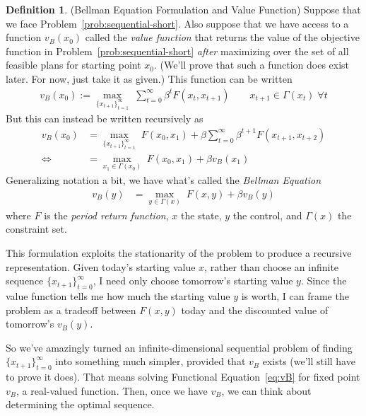 \documentclass[12pt]{article}
\numberwithin{equation}{section} %
\theoremstyle{plain}
\theoremstyle{definition}
\newtheorem{defn}[thm]{Definition}
\theoremstyle{remark}
\newcommand{\sumtinfz}{\sum^\infty_{t=0}}
\begin{document}
\begin{defn}{(Bellman Equation Formulation and Value Function)}
\label{defn:bellman}
Suppose that we face Problem~\ref{prob:sequential-short}.  Also suppose
that we have access to a function $v_B(x_0)$ called the \emph{value
function} that returns the value of the objective function in
Problem~\ref{prob:sequential-short} \emph{after} maximizing over the set
of all feasible plans for starting point $x_0$. (We'll prove that such a
function does exist later. For now, just take it as given.) This
function can be written
\begin{align*}
  v_B(x_0) :=
  \max_{\{x_{t+1}\}^\infty_{t=1}}\;
  \sumtinfz \beta^t F(x_t,x_{t+1})
  \qquad x_{t+1}\in\Gamma(x_t)\;\forall t
\end{align*}
But this can instead be written recursively as
\begin{align*}
  v_B(x_0)
  &=
  \max_{\{x_{t+1}\}^\infty_{t=1}}\;
  F(x_0,x_1) +
  \beta \sum^\infty_{t=0} \beta^{t+1} F(x_{t+1},x_{t+2})\\
  \Leftrightarrow\qquad
  &=
  \max_{x_1\in\Gamma(x_0)}\;
  F(x_0,x_1) +
  \beta v_B(x_1)
\end{align*}
Generalizing notation a bit, we have what's called the \emph{Bellman
Equation}
\begin{align}
  \label{eq:vB}
  v_B(y) &=
  \max_{y\in\Gamma(x)}\;
  F(x,y) +
  \beta v_B(y)
\end{align}
where $F$ is the \emph{period return function}, $x$ the state,
$y$ the control, and $\Gamma(x)$ the constraint set.

This formulation exploits the stationarity of the problem to
produce a recursive representation.  Given today's starting value $x$,
rather than choose an infinite sequence $\{x_{t+1}\}_{t=0}^\infty$, I
need only choose tomorrow's starting value $y$.  Since the value
function tells me how much the starting value $y$ is worth, I can frame
the problem as a tradeoff between $F(x,y)$ today and the discounted
value of tomorrow's $v_B(y)$.

So we've amazingly turned an infinite-dimensional sequential problem of
finding $\{x_{t+1}\}^\infty_{t=0}$ into something much simpler, provided
that $v_B$ exists (we'll still have to prove it does).  That means
solving Functional Equation~\ref{eq:vB} for fixed point $v_B$, a
real-valued function. Then, once we have $v_B$, we can think about
determining the optimal sequence.
\end{defn}
\end{document}

